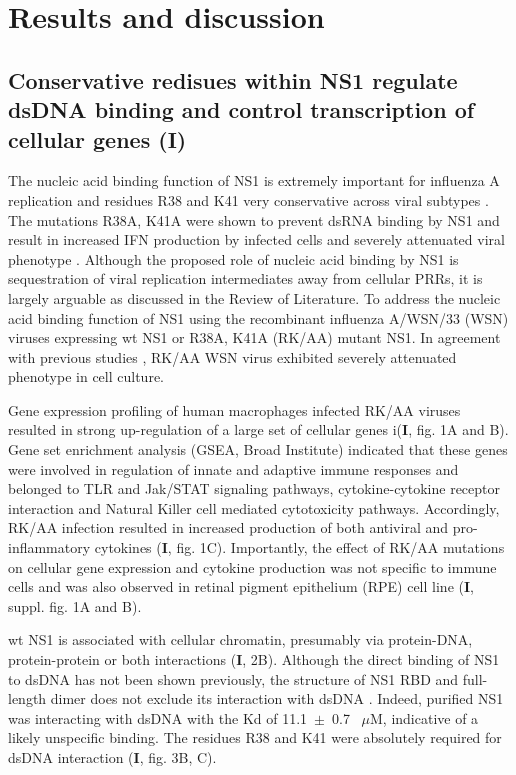 \clearpage
\section{Results and discussion}

	\subsection{Conservative redisues within NS1 regulate dsDNA binding and control transcription of cellular genes (I)}
	
		The nucleic acid binding function of NS1 is extremely important for influenza A replication and residues R38 and K41 very conservative across viral subtypes \parencite{Hatada1992, Zohari2008}. The mutations R38A, K41A were shown to prevent dsRNA binding by NS1 and result in increased IFN production by infected cells and severely attenuated viral phenotype \parencite{Donelan2003}. Although the proposed role of nucleic acid binding by NS1 is sequestration of viral replication intermediates away from cellular \gls{PRR}s, it is largely arguable as discussed in the Review of Literature. To address the nucleic acid binding function of NS1 using the recombinant influenza A/WSN/33 (WSN) viruses expressing \gls{wt} NS1 or R38A, K41A (RK/AA) mutant NS1. In agreement with previous studies \parencite{Min2006}, RK/AA WSN virus exhibited severely attenuated phenotype in cell culture. 
		
		Gene expression profiling of human macrophages infected RK/AA viruses resulted in strong up-regulation of a large set of cellular genes i(\textbf{I}, fig. 1A and B). Gene set enrichment analysis (GSEA, Broad Institute) indicated that these genes were involved in regulation of innate and adaptive immune responses and belonged to TLR and Jak/STAT signaling pathways, cytokine-cytokine receptor interaction and Natural Killer cell mediated cytotoxicity pathways. Accordingly, RK/AA infection resulted in increased production of both antiviral and pro-inflammatory cytokines (\textbf{I}, fig. 1C). Importantly, the effect of RK/AA mutations on cellular gene expression and cytokine production was not specific to immune cells and was also observed in retinal pigment epithelium (RPE) cell line (\textbf{I}, suppl. fig. 1A and B). 
		
		\Gls{wt} NS1 is associated with cellular chromatin, presumably via protein-DNA, protein-protein or both interactions (\textbf{I}, 2B). Although the direct binding of NS1 to dsDNA has not been shown previously, the structure of NS1 RBD and full-length dimer does not exclude its interaction with dsDNA \parencite{Bornholdt2008, Cheng2009}. Indeed, purified NS1 was interacting with dsDNA with the \gls{Kd} of 11.1~$\pm$~0.7~ $\mu$M, indicative of a likely unspecific binding. The residues R38 and K41 were absolutely required for dsDNA interaction (\textbf{I}, fig. 3B, C). 
		
